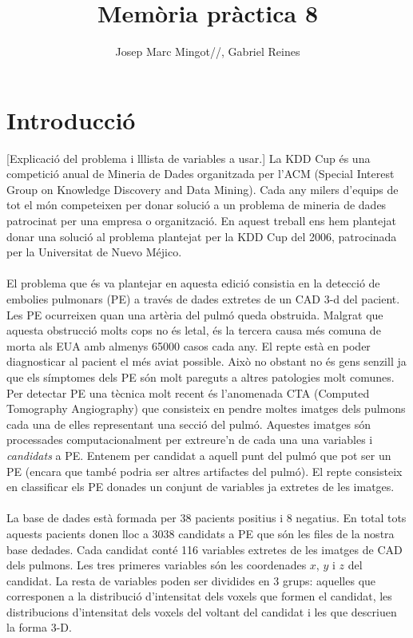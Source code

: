 \documentclass[a4paper,10pt]{article}
\title{Memòria pràctica 8}
\author{Josep Marc Mingot//, 
      Gabriel Reines}
\begin{document}



\maketitle

\begin{abstract}
\end{abstract}

\newpage
\tableofcontents

\newpage
\section{Introducció}

[Explicació del problema i lllista de variables a usar.]
La KDD Cup és una competició anual de Mineria de Dades organitzada per l'ACM (Special Interest Group on Knowledge Discovery and Data Mining). Cada any milers d'equips de tot el món competeixen per donar solució a un problema de mineria de dades patrocinat per una empresa o organització. En aquest treball ens hem plantejat donar una solució al problema plantejat per la KDD Cup del 2006, patrocinada per la Universitat de Nuevo Méjico.
\\
\\
El problema que és va plantejar en aquesta edició consistia en la detecció de embolies pulmonars (PE) a través de dades extretes de un CAD 3-d del pacient. Les PE ocurreixen quan una artèria del pulmó queda obstruida. Malgrat que aquesta obstrucció molts cops no és letal, és la tercera causa més comuna de morta als EUA amb almenys 65000 casos cada any. El repte està en poder diagnosticar al pacient el més aviat possible. Això no obstant no és gens senzill ja que els símptomes dels PE són molt pareguts a altres patologies molt comunes. Per detectar PE una tècnica molt recent és l'anomenada CTA (Computed Tomography Angiography) que consisteix en pendre moltes imatges dels pulmons cada una de elles representant una secció del pulmó. Aquestes imatges són processades computacionalment per extreure'n de cada una una variables i \textit{candidats} a PE. Entenem per candidat a aquell punt del pulmó que pot ser un PE (encara que també podria ser altres artifactes del pulmó). El repte consisteix en classificar els PE donades un conjunt de variables ja extretes de les imatges.
\\
\\
La base de dades està formada per 38 pacients positius i 8 negatius. En total tots aquests pacients donen lloc a 3038 candidats a PE que són les files de la nostra base dedades. Cada candidat conté 116 variables extretes de les imatges de CAD dels pulmons. Les tres primeres variables són les coordenades $x$, $y$ i $z$ del candidat. La resta de variables poden ser dividides en 3 grups: aquelles que corresponen a la distribució d'intensitat dels voxels que formen el candidat, les distribucions d'intensitat dels voxels del voltant del candidat i les que descriuen la forma 3-D.
\end{document}
